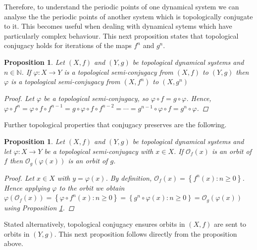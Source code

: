 \documentclass[11pt,a4paper,oneside]{memoir}
\theoremstyle{plain}
\newtheorem{prop}[thm]{Proposition}
\theoremstyle{definition}
\begin{document}
Therefore, to understand the periodic points of one dynamical system we can analyse the the periodic points of another system which is topologically conjugate to it. This becomes useful when dealing with dynamical sytems which have particularly complex behaviour. This next proposition states that topological conjugacy holds for iterations of the maps $f^n$ and $g^n$.

\begin{prop} \label{prop:conjugacy-preserved-under-iterations}
    Let $(X, f)$ and $(Y, g)$ be topological dynamical systems and $n \in \mathbb{N}$. If $\varphi: X \to Y$ is a topological semi-conjugacy from $(X, f)$ to $(Y, g)$ then $\varphi$ is a topological semi-conjugacy from $(X, f^n)$ to $(X, g^n)$
    \begin{proof}
        Let $\varphi$ be a topological semi-conjugacy, so $\varphi \circ f = g \circ \varphi$. Hence, $\varphi \circ f^n = \varphi \circ f \circ f^{n-1} = g \circ \varphi \circ f \circ f^{n-2} = \cdots = g^{n-1} \circ \varphi \circ f = g^n \circ \varphi$.
    \end{proof}
\end{prop}

Further topological properties that conjugacy preserves are the following.

\begin{prop} \label{prop:conjugacy-preserves-orbits}
    Let $(X, f)$ and $(Y, g)$ be topological dynamical systems and let $\varphi: X \to Y$ be a topological semi-conjugacy with $x \in X$. If $\mathcal{O}_f(x)$ is an orbit of $f$ then $\mathcal{O}_g(\varphi(x))$ is an orbit of $g$.
    \begin{proof}
        Let $x \in X$ with $y = \varphi(x)$. By definition, $\mathcal{O}_f(x) = \left\lbrace f^n(x) : n \geq 0 \right\rbrace$. Hence applying $\varphi$ to the orbit we obtain $\varphi\left(\mathcal{O}_f(x)\right) = \left\lbrace \varphi \circ f^n(x) : n \geq 0 \right\rbrace = \left\lbrace g^n \circ \varphi(x) : n \geq 0 \right\rbrace = \mathcal{O}_g(\varphi(x))$ using Proposition \ref{prop:conjugacy-preserved-under-iterations}.
    \end{proof}
\end{prop}

Stated alternatively, topological conjugacy ensures orbits in $(X, f)$ are sent to orbits in $(Y, g)$. This next proposition follows directly from the proposition above.
\end{document}
